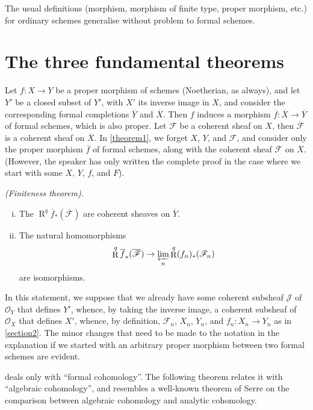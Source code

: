 \documentclass{article}
\theoremstyle{plain}
\newenvironment{theorem}[1]
  {\renewcommand\theinnercustomtheorem{#1}\innercustomtheorem}
  {\endinnercustomtheorem}
\newcommand{\sh}{\mathscr}
\DeclareMathOperator{\RR}{R}
\newcommand{\oldpage}[1]{\marginpar{\footnotesize$\Big\vert$ \textit{p.~#1}}}
\begin{document}
The usual definitions (morphism, morphism of finite type, proper morphism, etc.) for ordinary schemes generalise without problem to formal schemes.


\section{The three fundamental theorems}
\label{section3}

Let $f\colon X\to Y$ be a proper morphism of schemes (Noetherian, as always), and let $Y'$ be a closed subset of $Y'$, with $X'$ its inverse image in $X$, and consider the corresponding formal completions $\overline{Y}$ and $\overline{X}$.
Then $f$ induces a morphism $\overline{f}\colon\overline{X}\to\overline{Y}$ of formal schemes, which is also proper.
Let $\sh{F}$ be a coherent sheaf on $X$, then $\overline{\sh{F}}$ is a coherent sheaf on $\overline{X}$.
In \cref{theorem1}, we forget $X$, $Y$, and $\sh{F}$, and consider only the proper morphism $\overline{f}$ of formal schemes, along with the coherent sheaf $\overline{\sh{F}}$ on $\overline{X}$.
(However, the speaker has only written the complete proof in the case where we start with some $X$, $Y$, $f$, and $F$).

\begin{theorem}{1}
\label{theorem1}
  \emph{(Finiteness theorem).}
  \begin{enumerate}[i.]
    \item The $\RR^q\overline{f}_*(\overline{\sh{F}})$ are coherent sheaves on $\overline{Y}$.
    \item The natural homomorphisms
      \[
        \RR^q\overline{f}_*(\overline{\sh{F}}) \to \varprojlim_n\RR^q (f_n)_*(\sh{F}_n)
      \]
      are isomorphisms.
  \end{enumerate}
\end{theorem}

In this statement, we suppose that we already have some coherent subsheaf $\sh{J}$ of $\sh{O}_Y$ that defines $Y'$, whence, by taking the inverse image, a coherent subsheaf of $\sh{O}_X$ that defines $X'$, whence, by definition, $\sh{F}_n$, $X_n$, $Y_n$, and $f_n\colon X_n\to Y_n$ as in \cref{section2}.
The minor changes that need to be made to the notation in the explanation if we started with an arbitrary proper morphism between two formal schemes are evident.

 deals only with ``formal cohomology''.
The following theorem
\oldpage{182-05}
relates it with ``algebraic cohomology'', and resembles a well-known theorem of Serre \cite{4} on the comparison between algebraic cohomology and analytic cohomology.
\end{document}
